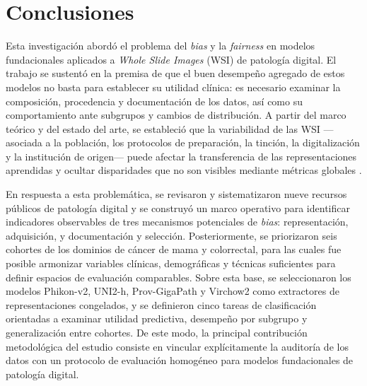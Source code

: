 \chapter{Conclusiones}
\label{cap:conclusiones}

Esta investigación abordó el problema del \textit{bias} y la \textit{fairness} en modelos fundacionales aplicados a \textit{Whole Slide Images} (WSI) de patología digital. El trabajo se sustentó en la premisa de que el buen desempeño agregado de estos modelos no basta para establecer su utilidad clínica: es necesario examinar la composición, procedencia y documentación de los datos, así como su comportamiento ante subgrupos y cambios de distribución. A partir del marco teórico y del estado del arte, se estableció que la variabilidad de las WSI ---asociada a la población, los protocolos de preparación, la tinción, la digitalización y la institución de origen--- puede afectar la transferencia de las representaciones aprendidas y ocultar disparidades que no son visibles mediante métricas globales \parencite{Basak2023,NEURIPS2024_c9826b9e}.

En respuesta a esta problemática, se revisaron y sistematizaron nueve recursos públicos de patología digital y se construyó un marco operativo para identificar indicadores observables de tres mecanismos potenciales de \textit{bias}: representación, adquisición, y documentación y selección. Posteriormente, se priorizaron seis cohortes de los dominios de cáncer de mama y colorrectal, para las cuales fue posible armonizar variables clínicas, demográficas y técnicas suficientes para definir espacios de evaluación comparables. Sobre esta base, se seleccionaron los modelos Phikon-v2, UNI2-h, Prov-GigaPath y Virchow2 como extractores de representaciones congelados, y se definieron cinco tareas de clasificación orientadas a examinar utilidad predictiva, desempeño por subgrupo y generalización entre cohortes. De este modo, la principal contribución metodológica del estudio consiste en vincular explícitamente la auditoría de los datos con un protocolo de evaluación homogéneo para modelos fundacionales de patología digital.


